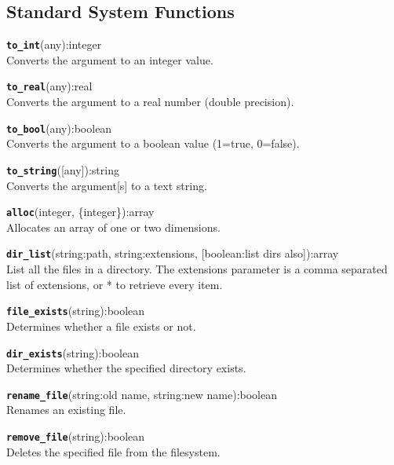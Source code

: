 \subsection{Standard System Functions}
\texttt{{\large\textbf{to\_int}}}\textsf{(any):integer}\\
 Converts the argument to an integer value.

\hrulefill

\texttt{{\large\textbf{to\_real}}}\textsf{(any):real}\\
 Converts the argument to a real number (double precision).

\hrulefill

\texttt{{\large\textbf{to\_bool}}}\textsf{(any):boolean}\\
 Converts the argument to a boolean value (1=true, 0=false).

\hrulefill

\texttt{{\large\textbf{to\_string}}}\textsf{([any]):string}\\
 Converts the argument[s] to a text string.

\hrulefill

\texttt{{\large\textbf{alloc}}}\textsf{(integer, \{integer\}):array}\\
 Allocates an array of one or two dimensions.

\hrulefill

\texttt{{\large\textbf{dir\_list}}}\textsf{(string:path, string:extensions, [boolean:list dirs also]):array}\\
 List all the files in a directory. The extensions parameter is a comma separated list of extensions, or * to retrieve every item.

\hrulefill

\texttt{{\large\textbf{file\_exists}}}\textsf{(string):boolean}\\
 Determines whether a file exists or not.

\hrulefill

\texttt{{\large\textbf{dir\_exists}}}\textsf{(string):boolean}\\
 Determines whether the specified directory exists.

\hrulefill

\texttt{{\large\textbf{rename\_file}}}\textsf{(string:old name, string:new name):boolean}\\
 Renames an existing file.

\hrulefill

\texttt{{\large\textbf{remove\_file}}}\textsf{(string):boolean}\\
 Deletes the specified file from the filesystem.

